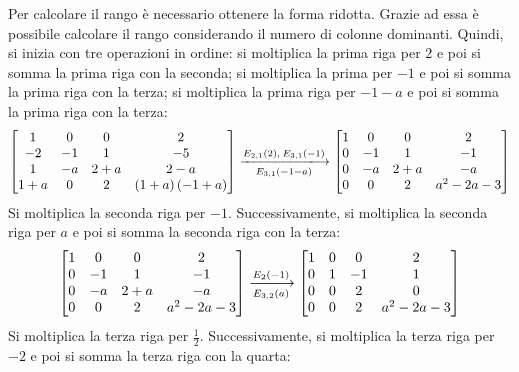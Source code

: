 \documentclass[a4paper]{article}
\makeatletter
\newenvironment{rowequmatbra}[1]{\left[\array{@{}#1@{}}}{\endarray\right]}
\makeatother
\begin{document}
	\noindent
	Per calcolare il rango è necessario ottenere la forma ridotta. Grazie ad essa è possibile calcolare il rango considerando il numero di colonne dominanti. Quindi, si inizia con tre operazioni in ordine: si moltiplica la prima riga per $2$ e poi si somma la prima riga con la seconda; si moltiplica la prima per $-1$ e poi si somma la prima riga con la terza; si moltiplica la prima riga per $-1-a$ e poi si somma la prima riga con la terza:
	\begin{equation*}
		\begin{rowequmatbra}{cccc}
			1 & 0 & 0 & 2 \\
			-2 & -1 & 1 & -5 \\
			1 & -a & 2+a & 2-a \\
			1+a & 0 & 2 & \left(1+a\right)\left(-1+a\right)
		\end{rowequmatbra}
		\xlongrightarrow[E_{3,1}\left(-1-a\right)]{E_{2,1}\left(2\right), \: E_{3,1}\left(-1\right)}
		\begin{rowequmatbra}{cccc}
			1 & 0 & 0 & 2 		\\
			0 & -1 & 1 & -1 	\\
			0 & -a & 2+a & -a 	\\
			0 & 0 & 2 & a^{2}-2a-3
		\end{rowequmatbra}
	\end{equation*}
	Si moltiplica la seconda riga per $-1$. Successivamente, si moltiplica la seconda riga per $a$ e poi si somma la seconda riga con la terza:
	\begin{equation*}
		\begin{rowequmatbra}{cccc}
			1 & 0 & 0 & 2 		\\
			0 & -1 & 1 & -1 	\\
			0 & -a & 2+a & -a 	\\
			0 & 0 & 2 & a^{2}-2a-3
		\end{rowequmatbra}
		\xlongrightarrow[E_{3,2}\left(a\right)]{E_{2}\left(-1\right)}
		\begin{rowequmatbra}{cccc}
			1 & 0 & 0 & 2 	\\
			0 & 1 & -1 & 1 	\\
			0 & 0 & 2 & 0 	\\
			0 & 0 & 2 & a^{2}-2a-3
		\end{rowequmatbra}
	\end{equation*}
	Si moltiplica la terza riga per $\frac{1}{2}$. Successivamente, si moltiplica la terza riga per $-2$ e poi si somma la terza riga con la quarta:
\end{document}
